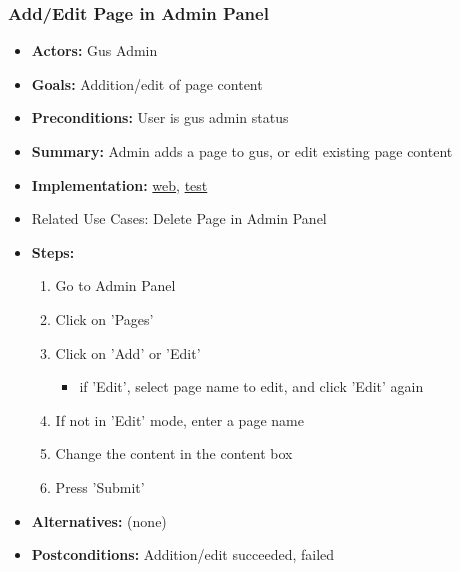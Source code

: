 		\subsubsection{Add/Edit Page in Admin Panel}
			\begin{itemize}
				\item{\textbf{Actors:} Gus Admin}
				\item{\textbf{Goals:} Addition/edit of page content}
				\item{\textbf{Preconditions:} User is gus admin status}
				\item{\textbf{Summary:} Admin adds a page to gus, or edit existing page content} 
				\item{\textbf{Implementation:} 	\href{http://nwerp.org/gus/index.php/pages/add}{web},
								\href{http://nwerp.org/gus/index.php/pages/test}{test}
				}
				\item{Related Use Cases: Delete Page in Admin Panel}
				\item{\textbf{Steps:}}
				\begin{enumerate}
					\item Go to Admin Panel
					\item Click on 'Pages'
					\item Click on 'Add' or 'Edit'
					\begin{itemize}
						\item if 'Edit', select page name to edit, and click 'Edit' again
					\end{itemize}
					\item If not in 'Edit' mode, enter a page name
					\item Change the content in the content box
					\item Press 'Submit'
				\end{enumerate}
				\item{\textbf{Alternatives:} (none)}
				\item{\textbf{Postconditions:} Addition/edit succeeded, failed}
			\end{itemize}

